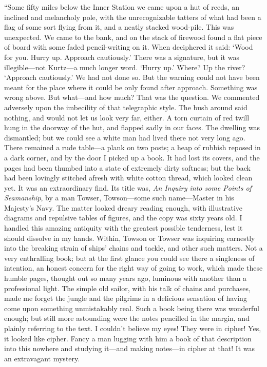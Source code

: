 \documentclass[12pt]{report}
\begin{document}
``Some fifty miles below the Inner Station we came upon a hut of reeds,
an inclined and melancholy pole, with the unrecognizable tatters of what
had been a flag of some sort flying from it, and a neatly stacked
wood-pile. This was unexpected. We came to the bank, and on the stack of
firewood found a flat piece of board with some faded pencil-writing on
it. When deciphered it said: `Wood for you. Hurry up. Approach
cautiously.' There was a signature, but it was illegible---not Kurtz---a
much longer word. `Hurry up.' Where? Up the river? `Approach
cautiously.' We had not done so. But the warning could not have been
meant for the place where it could be only found after approach.
Something was wrong above. But what---and how much? That was the
question. We commented adversely upon the imbecility of that telegraphic
style. The bush around said nothing, and would not let us look very far,
either. A torn curtain of red twill hung in the doorway of the hut, and
flapped sadly in our faces. The dwelling was dismantled; but we could
see a white man had lived there not very long ago. There remained a rude
table---a plank on two posts; a heap of rubbish reposed in a dark
corner, and by the door I picked up a book. It had lost its covers, and
the pages had been thumbed into a state of extremely dirty softness; but
the back had been lovingly stitched afresh with white cotton thread,
which looked clean yet. It was an extraordinary find. Its title was,
\emph{An Inquiry into some Points of Seamanship}, by a man Towser,
Towson---some such name---Master in his Majesty's Navy. The matter
looked dreary reading enough, with illustrative diagrams and repulsive
tables of figures, and the copy was sixty years old. I handled this
amazing antiquity with the greatest possible tenderness, lest it should
dissolve in my hands. Within, Towson or Towser was inquiring earnestly
into the breaking strain of ships' chains and tackle, and other such
matters. Not a very enthralling book; but at the first glance you could
see there a singleness of intention, an honest concern for the right way
of going to work, which made these humble pages, thought out so many
years ago, luminous with another than a professional light. The simple
old sailor, with his talk of chains and purchases, made me forget the
jungle and the pilgrims in a delicious sensation of having come upon
something unmistakably real. Such a book being there was wonderful
enough; but still more astounding were the notes pencilled in the
margin, and plainly referring to the text. I couldn't believe my eyes!
They were in cipher! Yes, it looked like cipher. Fancy a man lugging
with him a book of that description into this nowhere and studying
it---and making notes---in cipher at that! It was an extravagant
mystery.
\end{document}
